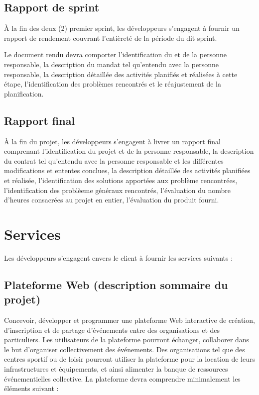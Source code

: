 \documentclass[letter,12pt]{exam}
\begin{document}
\subsection{Rapport de sprint}

À la fin des deux (2) premier sprint, les développeurs s'engagent à fournir un
rapport de rendement couvrant l'entièreté de la période du dit sprint.

Le document rendu devra comporter l'identification du et de la personne
responsable, la description du mandat tel qu'entendu avec la personne
responsable, la description détaillée des activités planifiés et
réalisées à cette étape, l'identification des problèmes rencontrés et le
réajustement de la planification.

\subsection{Rapport final}

À la fin du projet, les développeurs s'engagent à livrer un rapport
final comprenant l'identification du projet et de la personne
responsable, la description du contrat tel qu'entendu avec la personne
responsable et les différentes modifications et ententes conclues, la
description détaillée des activités planifiées et réalisée,
l'identification des solutions apportées aux problème rencontrées,
l'identification des problèeme généraux rencontrés, l'évaluation du
nombre d'heures consacrées au projet en entier, l'évaluation du produit
fourni.

\section{Services}

Les développeurs s'engagent envers le client à fournir les services
suivants :

\subsection{Plateforme Web (description sommaire du
projet)}

Concevoir, développer et programmer une plateforme Web interactive de
création, d'inscription et de partage d'événements entre des
organisations et des particuliers. Les utilisateurs de la plateforme
pourront échanger, collaborer dans le but d'organiser collectivement des
événements. Des organisations tel que des centres sportif ou de loisir
pourront utiliser la plateforme pour la location de leurs
infrastructures et équipements, et ainsi alimenter la banque de
ressources événementielles collective. La plateforme devra comprendre
minimalement les éléments suivant :
\end{document}
